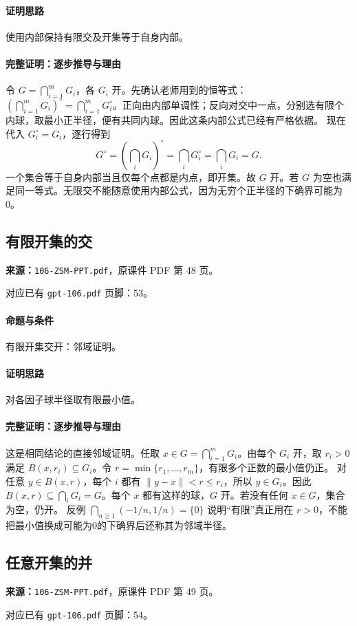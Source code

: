\paragraph{证明思路}使用内部保持有限交及开集等于自身内部。
\paragraph{完整证明：逐步推导与理由}

令 $G=\bigcap_{i=1}^mG_i$，各 $G_i$ 开。先确认老师用到的恒等式：$(\bigcap_{i=1}^mG_i)^\circ=\bigcap_{i=1}^mG_i^\circ$。正向由内部单调性；反向对交中一点，分别选有限个内球，取最小正半径，便有共同内球。因此这条内部公式已经有严格依据。
现在代入 $G_i^\circ=G_i$，逐行得到
\[G^\circ=\left(\bigcap_iG_i\right)^\circ=\bigcap_iG_i^\circ=\bigcap_iG_i=G.\]
一个集合等于自身内部当且仅每个点都是内点，即开集。故 $G$ 开。若 $G$ 为空也满足同一等式。无限交不能随意使用内部公式，因为无穷个正半径的下确界可能为0。

\clearpage\subsection{有限开集的交}
\textbf{来源：}\texttt{106-ZSM-PPT.pdf}，原课件 PDF 第 48 页。\par
对应已有 \texttt{gpt-106.pdf} 页脚：53。\par
\paragraph{命题与条件}有限开集交开：邻域证明。
\paragraph{证明思路}对各因子球半径取有限最小值。
\paragraph{完整证明：逐步推导与理由}

这是相同结论的直接邻域证明。任取 $x\in G=\bigcap_{i=1}^mG_i$。由每个 $G_i$ 开，取 $r_i>0$ 满足 $B(x,r_i)\subseteq G_i$。令 $r=\min\{r_1,\ldots,r_m\}$，有限多个正数的最小值仍正。
对任意 $y\in B(x,r)$，每个 $i$ 都有 $\|y-x\|<r\le r_i$，所以 $y\in G_i$。因此 $B(x,r)\subseteq\bigcap_iG_i=G$。每个 $x$ 都有这样的球，$G$ 开。若没有任何 $x\in G$，集合为空，仍开。
反例 $\bigcap_{n\ge1}(-1/n,1/n)=\{0\}$ 说明“有限”真正用在 $r>0$，不能把最小值换成可能为0的下确界后还称其为邻域半径。

\clearpage\subsection{任意开集的并}
\textbf{来源：}\texttt{106-ZSM-PPT.pdf}，原课件 PDF 第 49 页。\par
对应已有 \texttt{gpt-106.pdf} 页脚：54。\par
